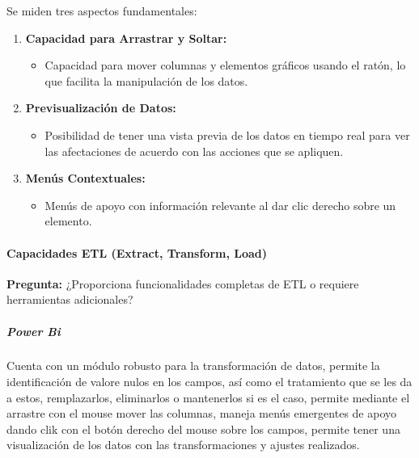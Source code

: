 \documentclass[
  11pt,
  bookmarksnumbered]{article}
\providecommand{\tightlist}{%
  \setlength{\itemsep}{0pt}\setlength{\parskip}{0pt}}
\begin{document}
Se miden tres aspectos fundamentales:

\begin{enumerate}
\def\labelenumi{\arabic{enumi}.}
\item
  \textbf{Capacidad para Arrastrar y Soltar:}

  \begin{itemize}
  \tightlist
  \item
    Capacidad para mover columnas y elementos gráficos usando el ratón, lo que facilita la manipulación de los datos.
  \end{itemize}
\item
  \textbf{Previsualización de Datos:}

  \begin{itemize}
  \tightlist
  \item
    Posibilidad de tener una vista previa de los datos en tiempo real para ver las afectaciones de acuerdo con las acciones que se apliquen.
  \end{itemize}
\item
  \textbf{Menús Contextuales:}

  \begin{itemize}
  \tightlist
  \item
    Menús de apoyo con información relevante al dar clic derecho sobre un elemento.
  \end{itemize}
\end{enumerate}

\hypertarget{capacidades-etl-extract-transform-load}{%
\paragraph{Capacidades ETL (Extract, Transform, Load)}\label{capacidades-etl-extract-transform-load}}

\textbf{Pregunta:} ¿Proporciona funcionalidades completas de ETL o requiere herramientas adicionales?

\hypertarget{power-bi}{%
\subparagraph{Power Bi}\label{power-bi}}

Cuenta con un módulo robusto para la transformación de datos, permite la identificación de valore nulos en los campos, así como el tratamiento que se les da a estos, remplazarlos, eliminarlos o mantenerlos si es el caso, permite mediante el arrastre con el mouse mover las columnas, maneja menús emergentes de apoyo dando clik con el botón derecho del mouse sobre los campos, permite tener una visualización de los datos con las transformaciones y ajustes realizados.
\end{document}
